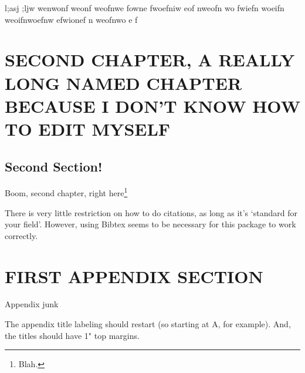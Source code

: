 \documentclass[openany]{book}
\begin{document}
        l;asj ;ljw wenwonf weonf weofnwe fowne fwoefniw eof
        nweofn wo fwiefn woeifn weoifnwoefnw efwionef n weofnwo e f

\chapter{SECOND CHAPTER, A REALLY LONG NAMED CHAPTER BECAUSE I DON'T KNOW HOW TO EDIT MYSELF}
\section{Second Section!}
        Boom, second chapter, right here\footnote{Blah.}

        There is very little restriction on how to do citations, as long
        as it's `standard for your field'\cite{Sethna1993}.
        However, using Bibtex seems to be necessary for this package
        to work correctly.

\appendix
\chapter{FIRST APPENDIX SECTION}
        Appendix junk

        The appendix title labeling should restart
        (so starting at A, for example).
        And, the titles should have 1" top margins.



\end{document}
